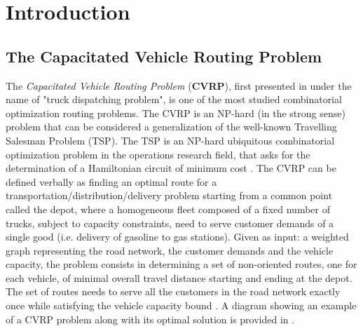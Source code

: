 \chapter{Introduction}
\label{sec:introduction-chapter}

\section{The Capacitated Vehicle Routing Problem}
\label{sec:intro-cvrp-problem}
The \textit{Capacitated Vehicle Routing Problem} (\textbf{CVRP}), first presented in \textcite{dantzig1959}
under the name of "truck dispatching problem",
is one of the most studied combinatorial optimization routing problems.
The CVRP is an NP-hard (in the strong sense) problem
that can be considered a generalization of the well-known Travelling Salesman Problem (TSP).
The TSP \parencite{flood1956}
is an NP-hard \parencite{garey1976planar} ubiquitous combinatorial optimization problem in the operations research field,
that asks for the determination of a Hamiltonian circuit of minimum cost
\parencite{croes1958, laporte1992,johnson1997,applegate2006,gutin2006,hoffman2013}.
The CVRP can be defined verbally as finding an optimal route for a transportation/distribution/delivery problem
starting from a common point called the depot,
where a homogeneous fleet composed of a fixed number of trucks, subject to capacity constraints,
need to serve customer demands of a single good (i.e. delivery of gasoline to gas stations).
Given as input: a weighted graph representing the road network,
the customer demands and the vehicle capacity,
the problem consists in determining a set of non-oriented routes, one for each vehicle,
of minimal overall travel distance starting and ending at the depot.
The set of routes needs to serve all the customers in the road network exactly once
while satisfying the vehicle capacity bound \parencite{toth2014}.
A diagram showing an example of a CVRP problem along with its optimal solution
is provided in .

